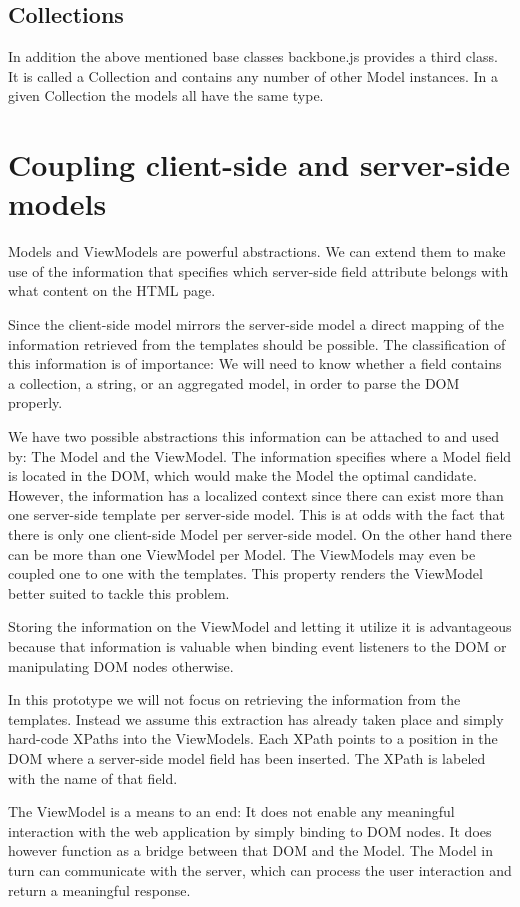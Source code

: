 \documentclass[thesis.tex]{subfiles}
\begin{document}
\subsection{Collections}
In addition the above mentioned base classes backbone.js provides a third class.
It is called a Collection and contains any number of other Model instances.
In a given Collection the models all have the same type.

\section{Coupling client-side and server-side models}
Models and ViewModels are powerful abstractions.
We can extend them to make use of the information that specifies
which server-side field attribute belongs with what content on the HTML page.

Since the client-side model mirrors the server-side model a direct mapping of
the information retrieved from the templates should be possible.
The classification of this information is of importance: We will need to know
whether a field contains a collection, a string, or an aggregated model,
in order to parse the DOM properly.

We have two possible abstractions this information can be attached to and
used by: The Model and the ViewModel.
The information specifies where a Model field is located in the DOM, which would
make the Model the optimal candidate. However, the information has a
localized context since there can exist more than one server-side template per
server-side model.
This is at odds with the fact that there is only one client-side Model
per server-side model.
On the other hand there can be more than one ViewModel per Model.
The ViewModels may even be coupled one to one with the templates.
This property renders the ViewModel better suited to tackle this problem.

Storing the information on the ViewModel and letting it utilize it is
advantageous because that information is valuable when binding event listeners
to the DOM or manipulating DOM nodes otherwise.

In this prototype we will not focus on retrieving the information from
the templates. Instead we assume this extraction has already taken place and
simply hard-code XPaths into the ViewModels. Each XPath points to a
position in the DOM where a server-side model field has been inserted.
The XPath is labeled with the name of that field.

The ViewModel is a means to an end: It does not enable any meaningful
interaction with the web application by simply binding to DOM nodes.
It does however function as a bridge between that DOM and the Model.
The Model in turn can communicate with the server, which can process
the user interaction and return a meaningful response.
\end{document}
